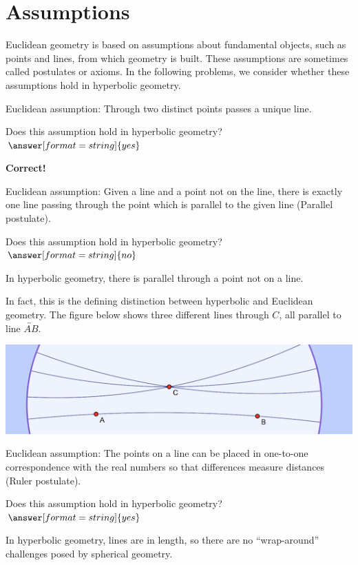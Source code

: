 \documentclass{ximera}
\begin{document}
\section*{Assumptions}
Euclidean geometry is based on assumptions about fundamental objects, such as points and lines, from which geometry is built. These assumptions are sometimes called postulates or axioms. In the following problems, we consider whether these assumptions hold in hyperbolic geometry. 


\begin{problem} %
Euclidean assumption: Through two distinct points passes a unique line.  

Does this assumption hold in hyperbolic geometry? 
$\answer[format=string]{yes}$

\begin{feedback}[correct]
\textbf{Correct!}   
\end{feedback}
\end{problem}

\begin{problem} %
Euclidean assumption: Given a line and a point not on the line, there is exactly one line passing through the point which is parallel to the given line (Parallel postulate).  

Does this assumption hold in hyperbolic geometry? 
$\answer[format=string]{no}$
\begin{problem}
In hyperbolic geometry, there is  parallel through a point not on a line. 
\begin{feedback}[correct]
In fact, this is the defining distinction between hyperbolic and Euclidean geometry.  The figure below shows three different lines through $C$, all parallel to line $\overleftrightarrow{AB}$.  
\begin{center}
\includegraphics{hyperbolicParallels.png}
\end{center}
\end{feedback}
\end{problem}
\end{problem}

\begin{problem} %
Euclidean assumption:  The points on a line can be placed in one-to-one correspondence with the real numbers so that differences measure distances (Ruler postulate).  

Does this assumption hold in hyperbolic geometry? 
$\answer[format=string]{yes}$
\begin{feedback}[correct]
In hyperbolic geometry, lines are  in length, so there are no ``wrap-around'' challenges posed by spherical geometry.  
\end{feedback}
\end{problem}
\end{document}
